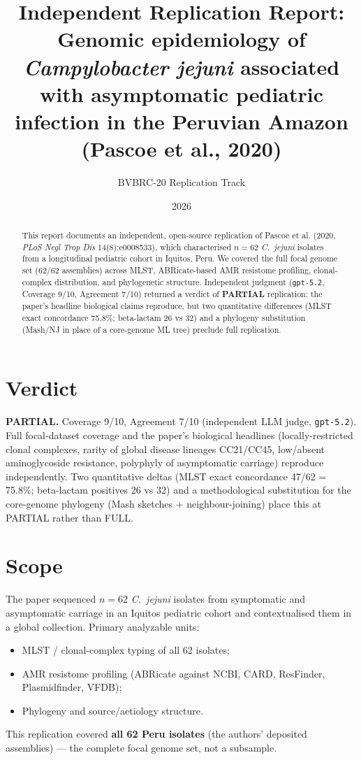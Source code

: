 \documentclass[11pt]{article}
\title{Independent Replication Report:\\
Genomic epidemiology of \emph{Campylobacter jejuni} associated with asymptomatic
pediatric infection in the Peruvian Amazon (Pascoe et al., 2020)}
\author{BVBRC-20 Replication Track}
\date{2026}
\begin{document}
\maketitle

\begin{abstract}
This report documents an independent, open-source replication of Pascoe et al.
(2020, \emph{PLoS Negl Trop Dis} 14(8):e0008533), which characterised
$n=62$ \emph{C.\ jejuni} isolates from a longitudinal pediatric cohort in
Iquitos, Peru. We covered the full focal genome set (62/62 assemblies) across
MLST, ABRicate-based AMR resistome profiling, clonal-complex distribution, and
phylogenetic structure. Independent judgment (\texttt{gpt-5.2},
Coverage 9/10, Agreement 7/10) returned a verdict of \textbf{PARTIAL}
replication: the paper's headline biological claims reproduce, but two
quantitative differences (MLST exact concordance 75.8\%; beta-lactam 26 vs 32)
and a phylogeny substitution (Mash/NJ in place of a core-genome ML tree)
preclude full replication.
\end{abstract}

\section{Verdict}

\textbf{PARTIAL.} Coverage 9/10, Agreement 7/10 (independent LLM judge,
\texttt{gpt-5.2}). Full focal-dataset coverage and the paper's biological
headlines (locally-restricted clonal complexes, rarity of global disease
lineages CC21/CC45, low/absent aminoglycoside resistance, polyphyly of
asymptomatic carriage) reproduce independently. Two quantitative deltas
(MLST exact concordance 47/62 = 75.8\%; beta-lactam positives 26 vs 32) and
a methodological substitution for the core-genome phylogeny (Mash sketches +
neighbour-joining) place this at PARTIAL rather than FULL.

\section{Scope}

The paper sequenced $n=62$ \emph{C.\ jejuni} isolates from symptomatic and
asymptomatic carriage in an Iquitos pediatric cohort and contextualised them in
a global collection. Primary analyzable units:
\begin{itemize}[leftmargin=1.5em]
  \item MLST / clonal-complex typing of all 62 isolates;
  \item AMR resistome profiling (ABRicate against NCBI, CARD, ResFinder,
        Plasmidfinder, VFDB);
  \item Phylogeny and source/aetiology structure.
\end{itemize}
This replication covered \textbf{all 62 Peru isolates} (the authors' deposited
assemblies) --- the complete focal genome set, not a subsample.
\end{document}
